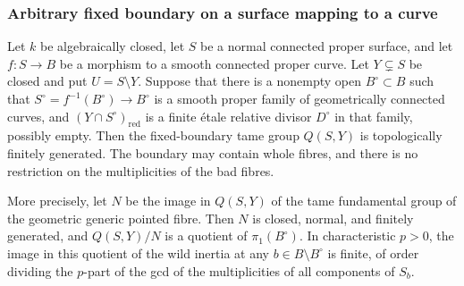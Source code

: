\subsubsection{Arbitrary fixed boundary on a surface mapping to a curve}

\begin{proposition}
\label{D:log-fibration-criterion}
Let $k$ be algebraically closed, let $S$ be a normal connected
proper surface, and let $f:S\to B$ be a morphism to a smooth
connected proper curve.  Let $Y\subsetneq S$ be closed and put
$U=S\setminus Y$.  Suppose that there is a nonempty open
$B^\circ\subset B$ such that $S^\circ=f^{-1}(B^\circ)\to B^\circ$
is a smooth proper family of geometrically connected curves,
and $(Y\cap S^\circ)_{\mathrm{red}}$ is a finite \'etale relative
divisor $D^\circ$ in that family, possibly empty.  Then the
fixed-boundary tame group $Q(S,Y)$ is topologically finitely
generated.  The boundary may contain whole fibres, and there
is no restriction on the multiplicities of the bad fibres.

More precisely, let $N$ be the image in $Q(S,Y)$ of the tame
fundamental group of the geometric generic pointed fibre.
Then $N$ is closed, normal, and finitely generated, and
$Q(S,Y)/N$ is a quotient of $\pi_1(B^\circ)$.  In characteristic
$p>0$, the image in this quotient of the wild inertia at any
$b\in B\setminus B^\circ$ is finite, of order dividing the
$p$-part of the gcd of the multiplicities of all components
of $S_b$.
\end{proposition}
